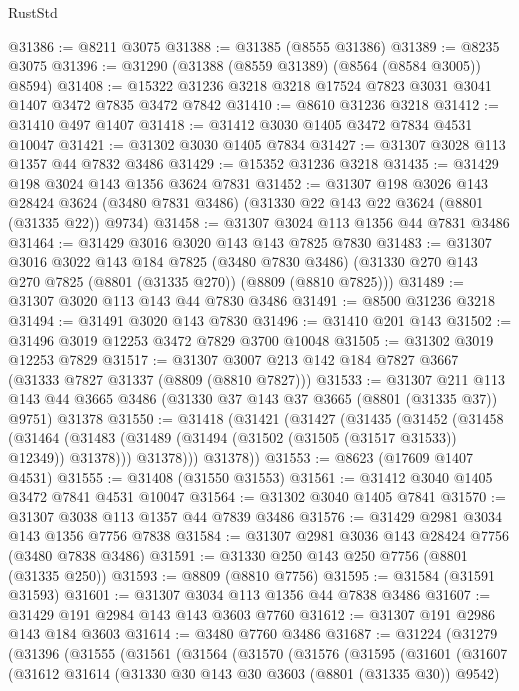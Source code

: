 \begin{lexlean}{RustStd}
\begin{coremodule}
@31386 := @8211 @3075
@31388 := @31385 (@8555 @31386)
@31389 := @8235 @3075
@31396 := @31290 (@31388 (@8559 @31389) (@8564 (@8584 @3005)) @8594)
@31408 := @15322 @31236 @3218 @3218 @17524 @7823 @3031 @3041 @1407 @3472 @7835 @3472 @7842
@31410 := @8610 @31236 @3218
@31412 := @31410 @497 @1407
@31418 := @31412 @3030 @1405 @3472 @7834 @4531 @10047
@31421 := @31302 @3030 @1405 @7834
@31427 := @31307 @3028 @113 @1357 @44 @7832 @3486
@31429 := @15352 @31236 @3218
@31435 := @31429 @198 @3024 @143 @1356 @3624 @7831
@31452 := @31307
    @198
    @3026
    @143
    @28424
    @3624
    (@3480 @7831 @3486)
    (@31330 @22 @143 @22 @3624 (@8801 (@31335 @22)) @9734)
@31458 := @31307 @3024 @113 @1356 @44 @7831 @3486
@31464 := @31429 @3016 @3020 @143 @143 @7825 @7830
@31483 := @31307
    @3016
    @3022
    @143
    @184
    @7825
    (@3480 @7830 @3486)
    (@31330 @270 @143 @270 @7825 (@8801 (@31335 @270)) (@8809 (@8810 @7825)))
@31489 := @31307 @3020 @113 @143 @44 @7830 @3486
@31491 := @8500 @31236 @3218
@31494 := @31491 @3020 @143 @7830
@31496 := @31410 @201 @143
@31502 := @31496 @3019 @12253 @3472 @7829 @3700 @10048
@31505 := @31302 @3019 @12253 @7829
@31517 := @31307 @3007 @213 @142 @184 @7827 @3667 (@31333 @7827 @31337 (@8809 (@8810 @7827)))
@31533 := @31307
    @211
    @113
    @143
    @44
    @3665
    @3486
    (@31330 @37 @143 @37 @3665 (@8801 (@31335 @37)) @9751)
    @31378
@31550 := @31418
    (@31421
      (@31427
        (@31435
          (@31452
            (@31458
              (@31464 (@31483 (@31489 (@31494 (@31502 (@31505 (@31517 @31533)) @12349)) @31378)))
              @31378)))
        @31378))
@31553 := @8623 (@17609 @1407 @4531)
@31555 := @31408 (@31550 @31553)
@31561 := @31412 @3040 @1405 @3472 @7841 @4531 @10047
@31564 := @31302 @3040 @1405 @7841
@31570 := @31307 @3038 @113 @1357 @44 @7839 @3486
@31576 := @31429 @2981 @3034 @143 @1356 @7756 @7838
@31584 := @31307 @2981 @3036 @143 @28424 @7756 (@3480 @7838 @3486)
@31591 := @31330 @250 @143 @250 @7756 (@8801 (@31335 @250))
@31593 := @8809 (@8810 @7756)
@31595 := @31584 (@31591 @31593)
@31601 := @31307 @3034 @113 @1356 @44 @7838 @3486
@31607 := @31429 @191 @2984 @143 @143 @3603 @7760
@31612 := @31307 @191 @2986 @143 @184 @3603
@31614 := @3480 @7760 @3486
@31687 := @31224
    (@31279
      (@31396
        (@31555
          (@31561
            (@31564
              (@31570
                (@31576
                  (@31595
                    (@31601
                      (@31607
                        (@31612
                          @31614
                          (@31330 @30 @143 @30 @3603 (@8801 (@31335 @30)) @9542)

\end{coremodule}
\end{lexlean}
